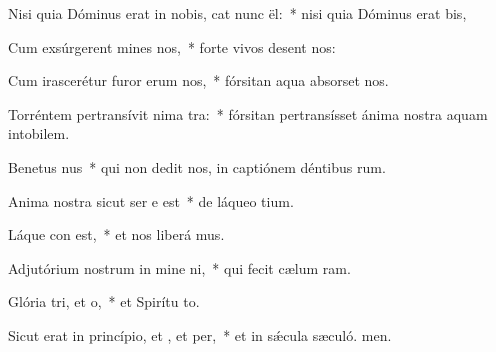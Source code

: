 \item Nisi quia Dóminus erat in nobis, cat nunc ël:~* nisi quia Dóminus erat  bis,
\item Cum exsúrgerent mines  nos,~* forte vivos desent nos:
\item Cum irascerétur furor erum  nos,~* fórsitan aqua absorset nos.
\item Torréntem pertransívit nima tra:~* fórsitan pertransísset ánima nostra aquam intobilem.
\item Benetus nus~* qui non dedit nos, in captiónem déntibus rum.
\item Anima nostra sicut ser e est~* de láqueo tium.
\item Láque con est,~* et nos liberá mus.
\item Adjutórium nostrum in mine ni,~* qui fecit cælum  ram.
\item Glória tri, et o,~* et Spirítu to.
\item Sicut erat in princípio, et , et per,~* et in sǽcula sæculó. men.
